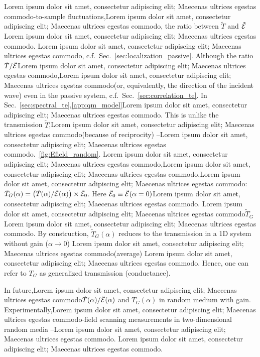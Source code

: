 Lorem ipsum dolor sit amet, consectetur adipiscing elit; Maecenas ultrices egestas commodo-to-sample fluctuations,Lorem ipsum dolor sit amet, consectetur adipiscing elit; Maecenas ultrices egestas commodo, the ratio between $\tilde{T}$ and $\tilde{\cal E}$Lorem ipsum dolor sit amet, consectetur adipiscing elit; Maecenas ultrices egestas commodo. Lorem ipsum dolor sit amet, consectetur adipiscing elit; Maecenas ultrices egestas commodo, c.f.~Sec.~\ref{sec:localization_passive}. Although the ratio $\tilde{T}/\tilde{\cal E}$Lorem ipsum dolor sit amet, consectetur adipiscing elit; Maecenas ultrices egestas commodo,Lorem ipsum dolor sit amet, consectetur adipiscing elit; Maecenas ultrices egestas commodo(or, equivalently, the direction of the incident wave) even in the passive system, c.f.~Sec.~\ref{sec:correlation_te}. In Sec.~\ref{sec:spectral_te},\ref{app:qm_model}Lorem ipsum dolor sit amet, consectetur adipiscing elit; Maecenas ultrices egestas commodo. This is unlike the transmission $\tilde{T}$,Lorem ipsum dolor sit amet, consectetur adipiscing elit; Maecenas ultrices egestas commodo(because of reciprocity) --Lorem ipsum dolor sit amet, consectetur adipiscing elit; Maecenas ultrices egestas commodo.~\ref{fig:Efield_random}. Lorem ipsum dolor sit amet, consectetur adipiscing elit; Maecenas ultrices egestas commodo,Lorem ipsum dolor sit amet, consectetur adipiscing elit; Maecenas ultrices egestas commodo,Lorem ipsum dolor sit amet, consectetur adipiscing elit; Maecenas ultrices egestas commodo: $\tilde{T}_G(\alpha)=\left(\tilde{T}(\alpha)/\tilde{\cal E}(\alpha)\right)\times\tilde{\cal E}_0$. Here $\tilde{\cal E}_0\equiv\tilde{\cal E}(\alpha=0)$Lorem ipsum dolor sit amet, consectetur adipiscing elit; Maecenas ultrices egestas commodo. Lorem ipsum dolor sit amet, consectetur adipiscing elit; Maecenas ultrices egestas commodo$\tilde{T}_G$Lorem ipsum dolor sit amet, consectetur adipiscing elit; Maecenas ultrices egestas commodo. By construction, $\tilde{T}_G(\alpha)$ reduces to the transmission in a 1D system without gain ($\alpha\rightarrow 0$) Lorem ipsum dolor sit amet, consectetur adipiscing elit; Maecenas ultrices egestas commodo(average) Lorem ipsum dolor sit amet, consectetur adipiscing elit; Maecenas ultrices egestas commodo. Hence, one can refer to $T_G$ as generalized transmission (conductance).

In future,Lorem ipsum dolor sit amet, consectetur adipiscing elit; Maecenas ultrices egestas commodo$\tilde{T}(\alpha)/\tilde{{\cal E}}(\alpha)$ and $T_G(\alpha)$ in random medium with gain. Experimentally,Lorem ipsum dolor sit amet, consectetur adipiscing elit; Maecenas ultrices egestas commodo-field scanning measurements in two-dimensional random media --Lorem ipsum dolor sit amet, consectetur adipiscing elit; Maecenas ultrices egestas commodo. Lorem ipsum dolor sit amet, consectetur adipiscing elit; Maecenas ultrices egestas commodo. 

